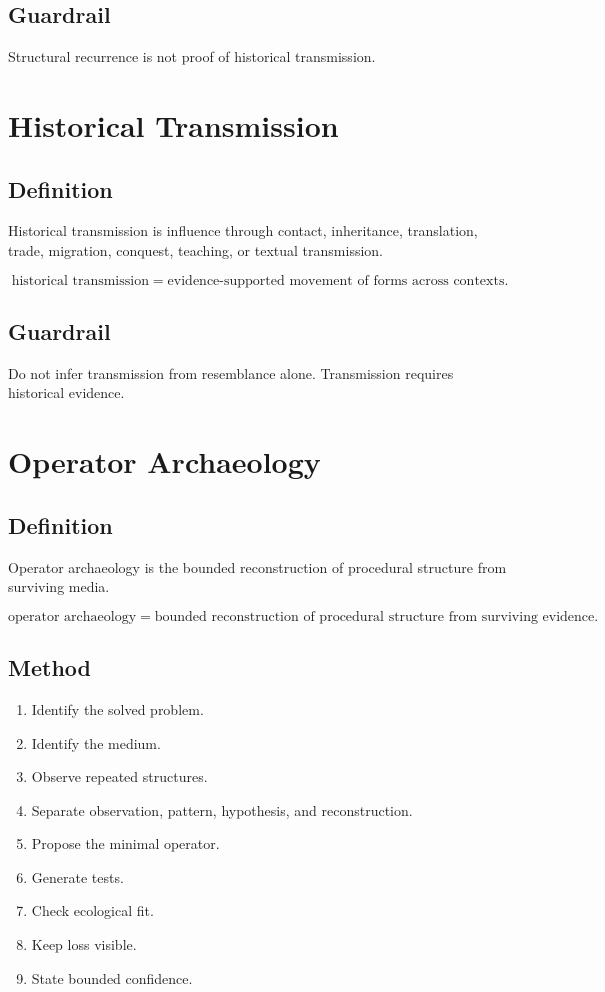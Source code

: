 \documentclass[11pt]{book}
\begin{document}
\subsection*{Guardrail}

Structural recurrence is not proof of historical transmission.

\section{Historical Transmission}

\subsection*{Definition}

Historical transmission is influence through contact, inheritance, translation, trade, migration, conquest, teaching, or textual transmission.

\[
\text{historical transmission} = \text{evidence-supported movement of forms across contexts}.
\]

\subsection*{Guardrail}

Do not infer transmission from resemblance alone. Transmission requires historical evidence.

\section{Operator Archaeology}

\subsection*{Definition}

Operator archaeology is the bounded reconstruction of procedural structure from surviving media.

\[
\text{operator archaeology}
=
\text{bounded reconstruction of procedural structure from surviving evidence}.
\]

\subsection*{Method}

\begin{enumerate}[label=\arabic*.]
    \item Identify the solved problem.
    \item Identify the medium.
    \item Observe repeated structures.
    \item Separate observation, pattern, hypothesis, and reconstruction.
    \item Propose the minimal operator.
    \item Generate tests.
    \item Check ecological fit.
    \item Keep loss visible.
    \item State bounded confidence.
\end{enumerate}
\end{document}
